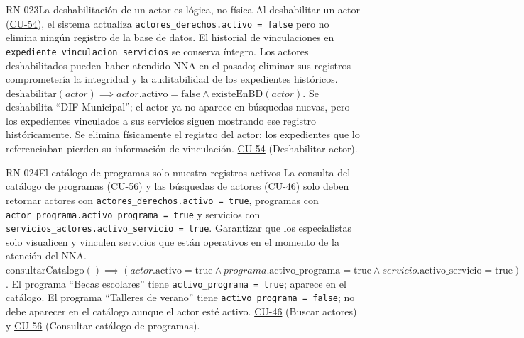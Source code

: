 \begin{BussinesRule}[%
	\brClassification{\btEnabler}{\bcCondition}{\blStrict}%
	]{RN-023}{La deshabilitación de un actor es lógica, no física}
	\BRitem[Descripción:] Al deshabilitar un actor (\hyperlink{CU-54}{CU-54}), el sistema actualiza \texttt{actores\_derechos.activo = false} pero no elimina ningún registro de la base de datos. El historial de vinculaciones en \texttt{expediente\_vinculacion\_servicios} se conserva íntegro.
	\BRitem[Motivación:] Los actores deshabilitados pueden haber atendido NNA en el pasado; eliminar sus registros comprometería la integridad y la auditabilidad de los expedientes históricos.
	\BRitem[Sentencia:] $\text{deshabilitar}(actor) \implies actor.\text{activo} = \text{false} \land \text{existeEnBD}(actor)$.
	 Se deshabilita ``DIF Municipal''; el actor ya no aparece en búsquedas nuevas, pero los expedientes vinculados a sus servicios siguen mostrando ese registro históricamente.
	 Se elimina físicamente el registro del actor; los expedientes que lo referenciaban pierden su información de vinculación.
	 \hyperlink{CU-54}{CU-54} (Deshabilitar actor).
\end{BussinesRule}

\begin{BussinesRule}[%
	\brClassification{\btEnabler}{\bcCondition}{\blStrict}%
	]{RN-024}{El catálogo de programas solo muestra registros activos}
	\BRitem[Descripción:] La consulta del catálogo de programas (\hyperlink{CU-56}{CU-56}) y las búsquedas de actores (\hyperlink{CU-46}{CU-46}) solo deben retornar actores con \texttt{actores\_derechos.activo = true}, programas con \texttt{actor\_programa.activo\_programa = true} y servicios con \texttt{servicios\_actores.activo\_servicio = true}.
	\BRitem[Motivación:] Garantizar que los especialistas solo visualicen y vinculen servicios que están operativos en el momento de la atención del NNA.
	\BRitem[Sentencia:] $\text{consultarCatalogo}() \implies (actor.\text{activo} = \text{true} \land programa.\text{activo\_programa} = \text{true} \land servicio.\text{activo\_servicio} = \text{true})$.
	 El programa ``Becas escolares'' tiene \texttt{activo\_programa = true}; aparece en el catálogo.
	 El programa ``Talleres de verano'' tiene \texttt{activo\_programa = false}; no debe aparecer en el catálogo aunque el actor esté activo.
	 \hyperlink{CU-46}{CU-46} (Buscar actores) y \hyperlink{CU-56}{CU-56} (Consultar catálogo de programas).
\end{BussinesRule}

